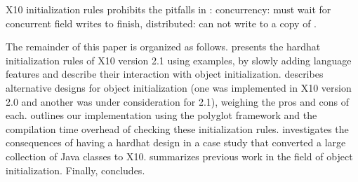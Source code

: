X10 initialization rules prohibits the pitfalls in :
        concurrency: must wait for concurrent field writes to finish,
        distributed: can not write to a copy of \this.



The remainder of this paper is organized as follows.
 presents the hardhat initialization rules of X10 version 2.1
    using examples,
    by slowly adding language features and describe their interaction with
    object initialization.
 describes alternative designs for object initialization
    (one was implemented in X10 version 2.0 and another was under consideration for 2.1),
    weighing the pros and cons of each.
 outlines our implementation using the polyglot framework
    and the compilation time overhead of checking these initialization rules.
 investigates the consequences of having a hardhat design
    in a case study that converted a large collection of Java classes to X10.
 summarizes previous work in the field of object initialization.
Finally,  concludes.
